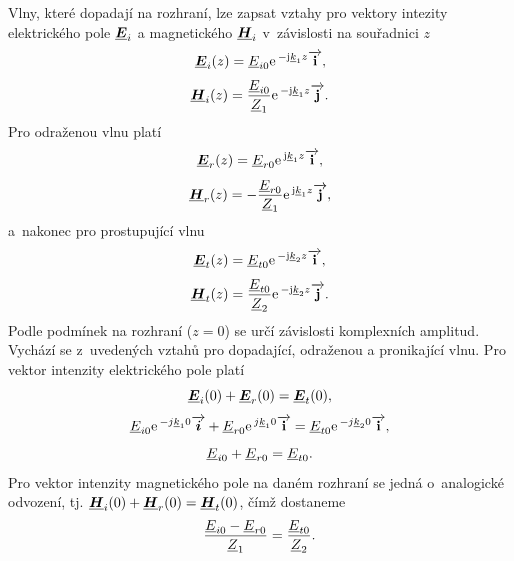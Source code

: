 Vlny, které dopadají na rozhraní, lze zapsat vztahy pro vektory intezity elektrického pole $\mbox{\underline{\boldmath$E$}}_{i}$ a magnetického $\mbox{\underline{\boldmath$H$}}_{i}$ v~závislosti na souřadnici $z$
\begin{displaymath}
	\mbox{\underline{\boldmath$E$}}_{i}(z) = {\underline{E}}_{i0}\mathrm{e\,}^{-\mathrm{j}{\underline{k}}_{1}z}\overrightarrow{\mathrm{\textbf{i}}},
\end{displaymath}
\begin{displaymath}
	\mbox{\underline{\boldmath$H$}}_{i}(z) = \frac{{\underline{E}}_{i0}}{{\underline{Z}}_{1}}\mathrm{e\,}^{-\mathrm{j}{\underline{k}}_{1}z}\overrightarrow{\mathrm{\textbf{j}}}.
\end{displaymath}
Pro odraženou vlnu platí
\begin{displaymath}
	\mbox{\underline{\boldmath$E$}}_{r}(z) = {\underline{E}}_{r0}\mathrm{e\,}^{\mathrm{j}{\underline{k}}_{1}z}\overrightarrow{\mathrm{\textbf{i}}},
\end{displaymath}
\begin{displaymath}
	\mbox{\underline{\boldmath$H$}}_{r}(z) = - \frac{{\underline{E}}_{r0}}{{\underline{Z}}_{1}}\mathrm{e\,}^{\mathrm{j}{\underline{k}}_{1}z}\overrightarrow{\mathrm{\textbf{j}}},
\end{displaymath}
a~nakonec pro prostupující vlnu
\begin{displaymath}
	\mbox{\underline{\boldmath$E$}}_{t}(z) = {\underline{E}}_{t0}\mathrm{e\,}^{-\mathrm{j}{\underline{k}}_{2}z}\overrightarrow{\mathrm{\textbf{i}}},
\end{displaymath}
\begin{displaymath}
	\mbox{\underline{\boldmath$H$}}_{t}(z) = \frac{{\underline{E}}_{t0}}{{\underline{Z}}_{2}}\mathrm{e\,}^{-\mathrm{j}{\underline{k}}_{2}z}\overrightarrow{\mathrm{\textbf{j}}}.
\end{displaymath}
Podle podmínek na rozhraní ($z = 0$) se určí závislosti komplexních amplitud. Vychází se z~uvedených vztahů pro dopadající, odraženou a pronikající vlnu.
Pro vektor intenzity elektrického pole platí
\begin{displaymath}
	\mbox{\underline{\boldmath$E$}}_{i}(0) + \mbox{\underline{\boldmath$E$}}_{r}(0)  = \mbox{\underline{\boldmath$E$}}_{t}(0),
\end{displaymath}
\begin{displaymath}
	 {\underline{E}}_{i0}\mathrm{e\,}^{-j{\underline{k}}_{1}0}\overrightarrow{\mbox{\boldmath$i$}} + {\underline{E}}_{r0}\mathrm{e\,}^{j{\underline{k}}_{1}0}\overrightarrow{\mathrm{\textbf{i}}}  = {\underline{E}}_{t0}\mathrm{e\,}^{-j{\underline{k}}_{2}0}\overrightarrow{\mathrm{\textbf{i}}},
\end{displaymath}
\begin{equation}
	{\underline{E}}_{i0} + {\underline{E}}_{r0}  = {\underline{E}}_{t0}.
	\label{rce:evlny_rozhrani_E}
\end{equation}
Pro vektor intenzity magnetického pole na daném rozhraní se jedná o~analogické odvození, tj. $\mbox{\underline{\boldmath$H$}}_{i}(0) + \mbox{\underline{\boldmath$H$}}_{r}(0)  = \mbox{\underline{\boldmath$H$}}_{t}(0)$, čímž dostaneme
\begin{equation}
	\frac{{\underline{E}}_{i0}-{\underline{E}}_{r0}}{{\underline{Z}}_{1}} = \frac{{\underline{E}}_{t0}}{{\underline{Z}}_{2}}.
	\label{rce:evlny_rozhrani_H}
\end{equation}
